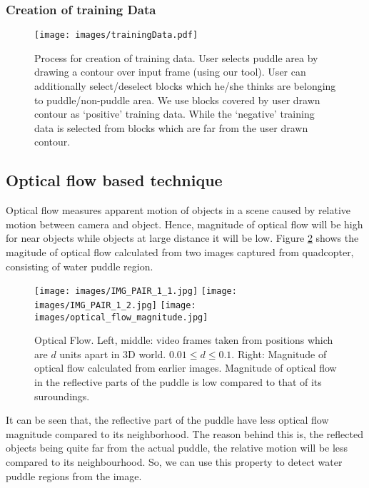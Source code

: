 \documentclass[times,10pt,twocolumn,letterpaper]{article}
\begin{document}
\cite{Chapelle99}

\subsubsection{Creation of training Data}

\begin{figure}[h!]
\centering
\texttt{[image: images/trainingData.pdf]}
\caption{Process for creation of training data. User selects puddle area by
drawing a contour over input frame (using our tool). User can additionally
select/deselect blocks which he/she thinks are belonging to puddle/non-puddle
area. We use blocks covered by user drawn contour as `positive' training data.
While the `negative' training data is selected from blocks which are far from
the user drawn contour.}
\label{fig:training}
\end{figure}


\subsection{Optical flow based technique}
Optical flow measures apparent motion of objects in a scene caused by relative
motion between camera and object. Hence, magnitude of optical flow will be high
for near objects while objects at large distance it will be low. Figure
\ref{fig:optical_flow} shows the magitude of optical flow calculated from two images
captured from quadcopter, consisting of water puddle region. 

\begin{figure}[h!]
\centering
\texttt{[image: images/IMG\_PAIR\_1\_1.jpg]}
\texttt{[image: images/IMG\_PAIR\_1\_2.jpg]}
\texttt{[image: images/optical\_flow\_magnitude.jpg]}
\caption{Optical Flow. Left, middle: video frames taken from positions
which are $d$ units apart in 3D world. $ 0.01 \leq d \leq 0.1$. Right:
Magnitude of optical flow calculated from earlier images. Magnitude of optical
flow in the reflective parts of the puddle is low compared to that of its
suroundings.}
\label{fig:optical_flow}
\end{figure}

It can be seen that, the reflective part of the puddle have less optical flow
magnitude compared to its neighborhood. The reason behind this is, the reflected objects being quite far
from the actual puddle, the relative motion will be less compared to its
neighbourhood. So, we can use this property to detect water puddle regions from
the image.
\end{document}
